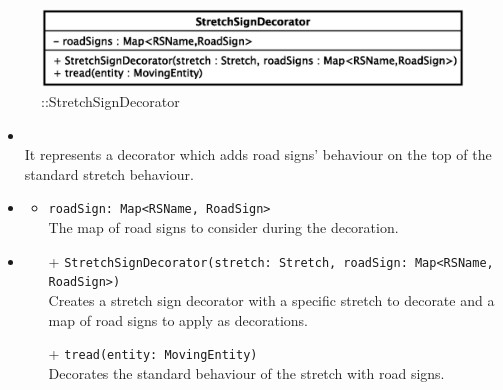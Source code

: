 \begin{figure}[h]
\centering
\includegraphics[scale=0.6,keepaspectratio]{images/solution/stretch_sign_decorator.eps}
\caption{\pReactiveComponentStretchDecoration::StretchSignDecorator}
\label{fig:sd-app-stretch_sign_decorator}
\end{figure}
\FloatBarrier
\begin{itemize}
  \item \textbf{\descr} \\
    It represents a decorator which adds road signs' behaviour on the top of the
    standard stretch behaviour. 
  \item \textbf{\attrs}
  \begin{itemize}
    \item \texttt{roadSign: Map<RSName, RoadSign>} \\
The map of road signs to consider during the decoration.
  \end{itemize}
  \item \textbf{\ops}
   \begin{itemize} 
   \item[+] \texttt{StretchSignDecorator(stretch: Stretch, roadSign: Map<RSName, RoadSign>)} \\
Creates a stretch sign decorator with a specific stretch to decorate and a map of road signs to apply as decorations.
    \item[+] \texttt{tread(entity: MovingEntity)} \\
Decorates the standard behaviour of the stretch with road signs.  
  \end{itemize}
\end{itemize}
